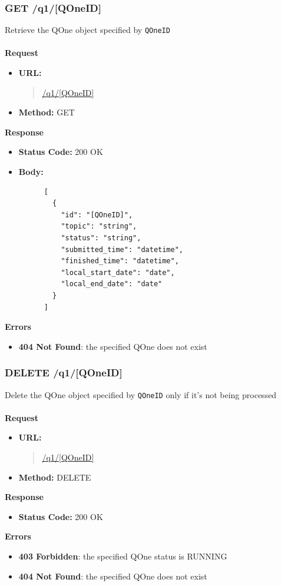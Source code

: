 \subsubsection{GET /q1/[QOneID]}
Retrieve the QOne object specified by \verb|QOneID| \\\\
\textbf{Request}
\begin{itemize}
  \item \textbf{URL:}
  \begin{quote}
    \url{/q1/[QOneID]}
  \end{quote}
  \item \textbf{Method:} GET
\end{itemize}\leavevmode\newline
\textbf{Response}
\begin{itemize}
  \item \textbf{Status Code:} 200 OK
  \item \textbf{Body:}
    \begin{lstlisting}
      [
        {
          "id": "[QOneID]",
          "topic": "string",
          "status": "string",
          "submitted_time": "datetime",
          "finished_time": "datetime",
          "local_start_date": "date",
          "local_end_date": "date"
        }
      ]
    \end{lstlisting}
\end{itemize}\leavevmode\newline
\textbf{Errors}
\begin{itemize}
  \item \textbf{404 Not Found}: the specified QOne does not exist
\end{itemize}

\subsubsection{DELETE /q1/[QOneID]}
Delete the QOne object specified by \verb|QOneID| only if it's not being processed \\\\
\textbf{Request}
\begin{itemize}
  \item \textbf{URL:}
  \begin{quote}
    \url{/q1/[QOneID]}
  \end{quote}
  \item \textbf{Method:} DELETE
\end{itemize}\leavevmode\newline
\textbf{Response}
\begin{itemize}
  \item \textbf{Status Code:} 200 OK
\end{itemize}\leavevmode\newline
\textbf{Errors}
\begin{itemize}
  \item \textbf{403 Forbidden}: the specified QOne status is RUNNING
  \item \textbf{404 Not Found}: the specified QOne does not exist
\end{itemize}

